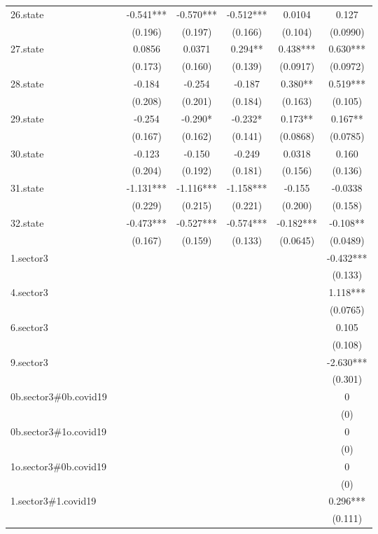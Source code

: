 \documentclass[]{article}
\begin{document}
\begin{tabular}{lcccccc}
26.state &  & -0.541*** & -0.570*** & -0.512*** & 0.0104 & 0.127 \\
 &  & (0.196) & (0.197) & (0.166) & (0.104) & (0.0990) \\
27.state &  & 0.0856 & 0.0371 & 0.294** & 0.438*** & 0.630*** \\
 &  & (0.173) & (0.160) & (0.139) & (0.0917) & (0.0972) \\
28.state &  & -0.184 & -0.254 & -0.187 & 0.380** & 0.519*** \\
 &  & (0.208) & (0.201) & (0.184) & (0.163) & (0.105) \\
29.state &  & -0.254 & -0.290* & -0.232* & 0.173** & 0.167** \\
 &  & (0.167) & (0.162) & (0.141) & (0.0868) & (0.0785) \\
30.state &  & -0.123 & -0.150 & -0.249 & 0.0318 & 0.160 \\
 &  & (0.204) & (0.192) & (0.181) & (0.156) & (0.136) \\
31.state &  & -1.131*** & -1.116*** & -1.158*** & -0.155 & -0.0338 \\
 &  & (0.229) & (0.215) & (0.221) & (0.200) & (0.158) \\
32.state &  & -0.473*** & -0.527*** & -0.574*** & -0.182*** & -0.108** \\
 &  & (0.167) & (0.159) & (0.133) & (0.0645) & (0.0489) \\
1.sector3 &  &  &  &  &  & -0.432*** \\
 &  &  &  &  &  & (0.133) \\
4.sector3 &  &  &  &  &  & 1.118*** \\
 &  &  &  &  &  & (0.0765) \\
6.sector3 &  &  &  &  &  & 0.105 \\
 &  &  &  &  &  & (0.108) \\
9.sector3 &  &  &  &  &  & -2.630*** \\
 &  &  &  &  &  & (0.301) \\
0b.sector3\#0b.covid19 &  &  &  &  &  & 0 \\
 &  &  &  &  &  & (0) \\
0b.sector3\#1o.covid19 &  &  &  &  &  & 0 \\
 &  &  &  &  &  & (0) \\
1o.sector3\#0b.covid19 &  &  &  &  &  & 0 \\
 &  &  &  &  &  & (0) \\
1.sector3\#1.covid19 &  &  &  &  &  & 0.296*** \\
 &  &  &  &  &  & (0.111) \\

\end{tabular}
\end{document}
